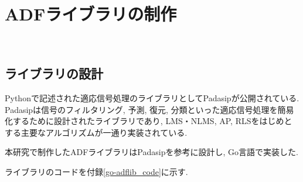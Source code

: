 








\section{ADFライブラリの制作}\label{create-adflib}

\
\subsection{ライブラリの設計}\label{design-adf}

Pythonで記述された適応信号処理のライブラリとしてPadasip\cite{padasip}が公開されている. Padasipは信号のフィルタリング, 予測, 復元, 分類といった適応信号処理を簡易化するために設計されたライブラリであり, LMS・NLMS, AP, RLSをはじめとする主要なアルゴリズムが一通り実装されている. 

本研究で制作したADFライブラリはPadasipを参考に設計し, Go言語で実装した. 

ライブラリのコードを付録\ref{go-adflib_code}に示す. 

